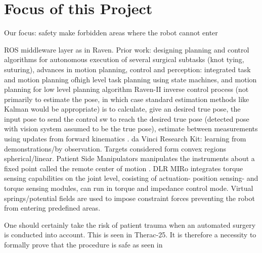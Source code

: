 \section{Focus of this Project}
Our focus:
safety
make forbidden areas where the robot cannot enter

ROS middleware layer as in Raven.
Prior work: designing planning and control algorithms for autonomous execution of several surgical subtasks (knot tying, suturing), advances in motion planning, control and perception: integrated task and motion planning ofhigh level task planning using state machines, and motion planning for low level planning algorithm  \citep{bib:raven_debride}
Raven-II inverse control process (not primarily to estimate the pose, in which case standard estimation methods like Kalman would be appropriate) is to calculate, give an desired true pose, the input pose to send the control sw to reach the desired true pose (detected pose with vision system assumed to be the true pose), estimate between measurements using updates from forward kinematics \citep{bib:raven_debride}.
da Vinci Research Kit: learning from demonstrations/by observation. Targets considered form convex regions spherical/linear. Patient Side Manipulators manipulates the instruments about a fixed point called the remote center of motion \citep{bib:raven_observ}.
DLR MIRo integrates torque sensing capabilities on the joint level, cosisting of actuation- position sensing- and torque sensing modules, can run in torque and impedance control mode. Virtual springs/potential fields are used to impose constraint forces preventing the robot from  entering predefined areas.


One should certainly take the risk of patient trauma when an automated surgery is conducted into account. This is seen in Therac-25. It is therefore a necessity to formally prove that the procedure is safe as seen in \citep{bib:safety}